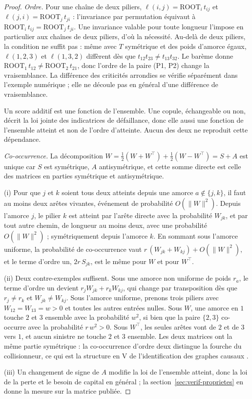 \begin{proof}
\emph{Ordre.} Pour une chaîne de deux piliers, $\ell(i,j)=\mathrm{ROOT}_i\,t_{ij}$ et
$\ell(j,i)=\mathrm{ROOT}_j\,t_{ji}$ : l'invariance par permutation équivaut à
$\mathrm{ROOT}_i\,t_{ij}=\mathrm{ROOT}_j\,t_{ji}$. Une invariance valable
pour toute longueur l'impose en particulier aux chaînes de deux piliers, d'où la nécessité. Au-delà
de deux piliers, la condition ne suffit pas : même avec $T$ symétrique et des poids
d'amorce égaux, $\ell(1,2,3)$ et $\ell(1,3,2)$ diffèrent dès que
$t_{12}t_{23}\neq t_{13}t_{32}$. Le barème donne
$\mathrm{ROOT}_1\,t_{12}\neq\mathrm{ROOT}_2\,t_{21}$, donc l'ordre de la paire (P1, P2) change la vraisemblance. La différence des criticités arrondies se vérifie séparément dans l'exemple numérique ; elle ne découle pas en général d'une différence de vraisemblance.

Un
score additif est une fonction de l'ensemble. Une copule, échangeable ou non, décrit la loi jointe
des indicatrices de défaillance, donc elle aussi une fonction de l'ensemble atteint et non de
l'ordre d'atteinte. Aucun des deux ne reproduit cette dépendance.

\emph{Co-occurrence.} La décomposition $W=\tfrac12(W+W^\top)+\tfrac12(W-W^\top)=S+A$ est
unique car $S$ est symétrique, $A$ antisymétrique, et cette somme directe est celle des
matrices en parties symétrique et antisymétrique.

(i) Pour que $j$ et $k$ soient tous deux atteints depuis une amorce $a\notin\{j,k\}$, il faut au
moins deux arêtes vivantes, événement de probabilité $O(\lVert W\rVert^2)$. Depuis l'amorce $j$,
le pilier $k$ est atteint par l'arête directe avec la probabilité $W_{jk}$, et par tout autre
chemin, de longueur au moins deux, avec une probabilité $O(\lVert W\rVert^2)$ ; symétriquement
depuis l'amorce $k$. En sommant sous l'amorce uniforme, la probabilité de co-occurrence vaut
$r\,(W_{jk}+W_{kj})+O(\lVert W\rVert^2)$, et le terme d'ordre un, $2r\,S_{jk}$, est le même pour
$W$ et pour $W^\top$.

(ii) Deux contre-exemples suffisent. Sous une amorce non uniforme de poids $r_a$, le terme
d'ordre un devient $r_j W_{jk}+r_k W_{kj}$, qui change par transposition dès que $r_j\neq r_k$ et
$W_{jk}\neq W_{kj}$. Sous l'amorce uniforme, prenons trois piliers avec $W_{12}=W_{13}=w>0$ et
toutes les autres entrées nulles. Sous $W$, une amorce en $1$ touche $2$ et $3$ ensemble avec la
probabilité $w^2$, si bien que la paire $\{2,3\}$ co-occurre avec la probabilité $r\,w^2>0$. Sous
$W^\top$, les seules arêtes vont de $2$ et de $3$ vers $1$, et aucun sinistre ne touche $2$ et $3$
ensemble. Les deux matrices ont la même partie symétrique : la co-occurrence d'ordre deux
distingue la fourche du collisionneur, ce qui est la structure en V de l'identification des
graphes causaux \citep{verma1990equivalence}.

(iii) Un changement de signe de $A$ modifie la loi de l'ensemble atteint, donc la loi de la perte
et le besoin de capital en général ; la section~\ref{sec:verif-proprietes} en donne la mesure sur la matrice
publiée.
\end{proof}

